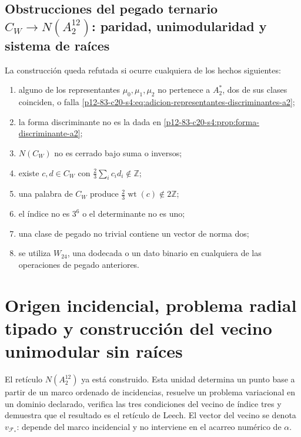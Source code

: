 \subsection{Obstrucciones del pegado ternario \(C_W\to N(A_2^{12})\): paridad, unimodularidad y sistema de raíces}

\begin{criterion}
La construcción queda refutada si ocurre cualquiera de los hechos
siguientes:
\begin{enumerate}
 \item alguno de los representantes \(\mu_0,\mu_1,\mu_2\) no pertenece a
       \(A_2^*\), dos de sus clases coinciden, o falla
       \eqref{p12-83-c20-s4:eq:adicion-representantes-discriminantes-a2};
 \item la forma discriminante no es la dada en
       \cref{p12-83-c20-s4:prop:forma-discriminante-a2};
 \item \(N(C_W)\) no es cerrado bajo suma o inversos;
 \item existe \(c,d\in C_W\) con
       \(\frac23\sum_i c_id_i\notin\mathbb Z\);
 \item una palabra de \(C_W\) produce
       \(\frac23\operatorname{wt}(c)\notin2\mathbb Z\);
 \item el índice no es \(3^6\) o el determinante no es uno;
 \item una clase de pegado no trivial contiene un vector de norma dos;
 \item se utiliza \(W_{24}\), una dodecada o un dato binario en cualquiera
       de las operaciones de pegado anteriores.
\end{enumerate}
\end{criterion}



\section{Origen incidencial, problema radial tipado y construcción del vecino unimodular sin raíces}
\label{p12-83-c20-s5:chap:origen-incidencial-vecino-leech}

El retículo \(N(A_2^{12})\) ya está construido. Esta unidad determina un
punto base a partir de un marco ordenado de incidencias, resuelve un
problema variacional en un dominio declarado, verifica las tres condiciones
del vecino de índice tres y demuestra que el resultado es el retículo de
Leech. El vector del vecino se denota \(v_{\mathcal F_*}\): depende del
marco incidencial y no interviene en el acarreo numérico de \(\alpha\).

